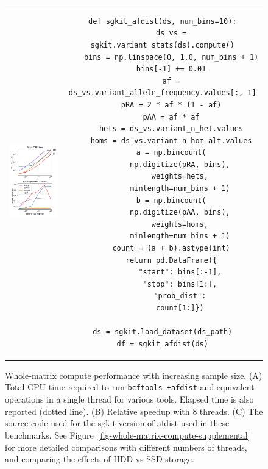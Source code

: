 \documentclass[a4paper,num-refs]{oup-contemporary}
\begin{document}
\begin{figure}
\begin{tabular}{cc}
\includegraphics[width=6cm]{figures/whole-matrix-compute} &
\begin{tcolorbox}[width=7cm]
\begin{verbatim}
def sgkit_afdist(ds, num_bins=10):
    ds_vs = sgkit.variant_stats(ds).compute()
    bins = np.linspace(0, 1.0, num_bins + 1)
    bins[-1] += 0.01
    af = ds_vs.variant_allele_frequency.values[:, 1]
    pRA = 2 * af * (1 - af)
    pAA = af * af
    hets = ds_vs.variant_n_het.values
    homs = ds_vs.variant_n_hom_alt.values
    a = np.bincount(
        np.digitize(pRA, bins),
        weights=hets,
        minlength=num_bins + 1)
    b = np.bincount(
        np.digitize(pAA, bins),
        weights=homs,
        minlength=num_bins + 1)
    count = (a + b).astype(int)
    return pd.DataFrame({
        "start": bins[:-1],
        "stop": bins[1:],
        "prob_dist":
        count[1:]})

ds = sgkit.load_dataset(ds_path)
df = sgkit_afdist(ds)
\end{verbatim}
\end{tcolorbox}
\end{tabular}
\caption{Whole-matrix compute performance with increasing sample size.
(A) Total CPU time required to run \texttt{bcftools +afdist}
and equivalent operations in a single thread for various tools.
Elapsed time is also reported (dotted line).
(B) Relative speedup with 8 threads.
(C) The source code used for the sgkit version of afdist used in these
benchmarks. See Figure~\ref{fig-whole-matrix-compute-supplemental} for
more detailed comparisons with different numbers of threads, and comparing
the effects of HDD vs SSD storage.
\label{fig-whole-matrix-compute}}
\end{figure}
\end{document}
